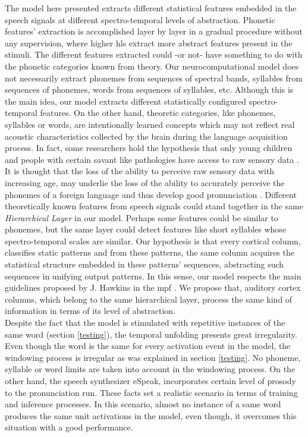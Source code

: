 \documentclass[11pt,a4paper]{article}
\begin{document}
The model here presented extracts different statistical features
embedded in the speech signals at different spectro-temporal
levels of abstraction.
Phonetic features' extraction is accomplished layer by layer in a
gradual procedure without any supervision, where higher \ac{hl}s
extract more abstract features present in the stimuli.
The different features extracted could -or not- have something to do
with the phonetic categories known from theory.
Our neurocomputational model does not necessarily extract phonemes from sequences of
spectral bands, syllables from sequences of phonemes, words from sequences of syllables, etc.
Although this is the main idea, our model
extracts different statistically configured spectro-temporal features.
On the other hand, theoretic categories, like phonemes, syllables or words,
are intentionally learned concepts which
may not reflect real acoustic
characteristics collected by the brain during the language
acquisition process.
In fact, some researchers hold the hypothesis that only young children
and people with certain savant like pathologies have access to raw sensory
data \cite{bossomaier04}.
It is thought that the loss of the ability to perceive raw sensory data with increasing age,
may underlie the loss of the ability to
accurately perceive the phonemes of a foreign language and thus develop good pronunciation \cite{bossomaier04}.
Different theoretically known features from speech signals
could stand together in the same \textit{Hierarchical Layer} in
our model. Perhaps some features could be similar to phonemes, but the same layer could detect
features like short syllables whose spectro-temporal scales are similar.
Our hypothesis is that every cortical column, classifies static patterns
and from these patterns, the same column acquires the statistical structure
embedded in these patterns' sequences, abstracting such sequences in unifying
output patterns.
In this sense, our model respects the main guidelines proposed by J. Hawkins
in the \ac{mpf} \cite{hawkins04}.
We propose that, auditory cortex columns, which belong to the same
hierarchical layer, process the same kind of information
in terms of its level of abstraction.\\

Despite the fact that the model is stimulated with
repetitive instances of the same word (section \ref{testing}),
the temporal unfolding presents great irregularity.
Even though the word is the same for every activation
event in the model,
the windowing process is irregular as was explained
in section \ref{testing}.
No phoneme, syllable or word limits are taken into account
in the windowing process.
On the other hand, the speech synthesizer eSpeak,
incorporates certain level of prosody to the pronunciation run.
These facts set a realistic scenario in terms of training
and inference processes.
In this scenario, almost no instance of a same word produces
the same unit activations in the model, even though, it overcomes
this situation with a good performance.\\
\end{document}
